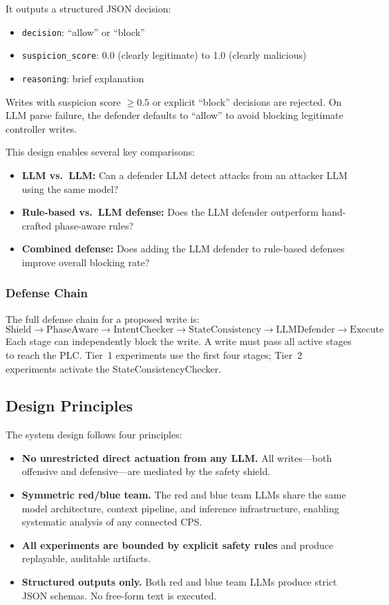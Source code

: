 It outputs a structured JSON decision:
\begin{itemize}[leftmargin=1.2em,nosep]
    \item \texttt{decision}: ``allow'' or ``block''
    \item \texttt{suspicion\_score}: 0.0 (clearly legitimate) to 1.0 (clearly malicious)
    \item \texttt{reasoning}: brief explanation
\end{itemize}

Writes with suspicion score $\geq 0.5$ or explicit ``block'' decisions are rejected. On LLM parse failure, the defender defaults to ``allow'' to avoid blocking legitimate controller writes.

This design enables several key comparisons:
\begin{itemize}[leftmargin=1.2em,nosep]
    \item \textbf{LLM vs.\ LLM:} Can a defender LLM detect attacks from an attacker LLM using the same model?
    \item \textbf{Rule-based vs.\ LLM defense:} Does the LLM defender outperform hand-crafted phase-aware rules?
    \item \textbf{Combined defense:} Does adding the LLM defender to rule-based defenses improve overall blocking rate?
\end{itemize}

\subsubsection{Defense Chain}
The full defense chain for a proposed write is:
\[
\text{Shield} \to \text{PhaseAware} \to \text{IntentChecker} \to \text{StateConsistency} \to \text{LLMDefender} \to \text{Execute}
\]
Each stage can independently block the write. A write must pass all active stages to reach the PLC. Tier~1 experiments use the first four stages; Tier~2 experiments activate the StateConsistencyChecker.

\subsection{Design Principles}

The system design follows four principles:
\begin{itemize}[leftmargin=1.5em]
    \item \textbf{No unrestricted direct actuation from any LLM.} All writes---both offensive and defensive---are mediated by the safety shield.
    \item \textbf{Symmetric red/blue team.} The red and blue team LLMs share the same model architecture, context pipeline, and inference infrastructure, enabling systematic analysis of any connected CPS.
    \item \textbf{All experiments are bounded by explicit safety rules} and produce replayable, auditable artifacts.
    \item \textbf{Structured outputs only.} Both red and blue team LLMs produce strict JSON schemas. No free-form text is executed.
\end{itemize}
